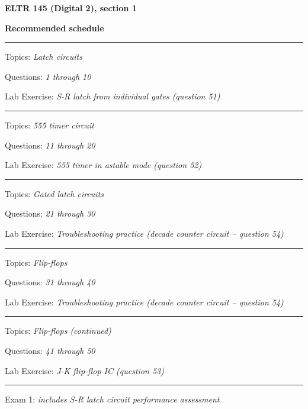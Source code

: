 
\centerline{\bf ELTR 145 (Digital 2), section 1} \bigskip 
 
\vskip 10pt

\noindent
{\bf Recommended schedule}

\vskip 5pt

\hrule \vskip 5pt
\noindent
{}

\hskip 10pt Topics: {\it Latch circuits}
 
\hskip 10pt Questions: {\it 1 through 10}
 
\hskip 10pt Lab Exercise: {\it S-R latch from individual gates (question 51)}
 

\vskip 10pt
\hrule \vskip 5pt
\noindent
{}

\hskip 10pt Topics: {\it 555 timer circuit}
 
\hskip 10pt Questions: {\it 11 through 20}
 
\hskip 10pt Lab Exercise: {\it 555 timer in astable mode (question 52)}
 
\vskip 10pt
\hrule \vskip 5pt
\noindent
{}

\hskip 10pt Topics: {\it Gated latch circuits}
 
\hskip 10pt Questions: {\it 21 through 30}
 
\hskip 10pt Lab Exercise: {\it Troubleshooting practice (decade counter circuit -- question 54)}
 
\vskip 10pt
\hrule \vskip 5pt
\noindent
{}

\hskip 10pt Topics: {\it Flip-flops}
 
\hskip 10pt Questions: {\it 31 through 40}
 
\hskip 10pt Lab Exercise: {\it Troubleshooting practice (decade counter circuit -- question 54)}
 
\vskip 10pt
\hrule \vskip 5pt
\noindent
{}

\hskip 10pt Topics: {\it Flip-flops (continued)}
 
\hskip 10pt Questions: {\it 41 through 50}
 
\hskip 10pt Lab Exercise: {\it J-K flip-flop IC (question 53)}
 
\vskip 10pt
\hrule \vskip 5pt
\noindent
{}

\hskip 10pt Exam 1: {\it includes S-R latch circuit performance assessment}
 
